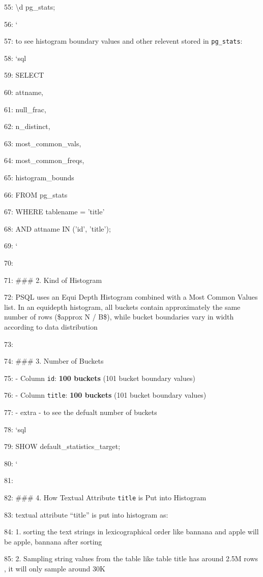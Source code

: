 \documentclass[11pt,a4paper]{article}
\begin{document}
55: \textbackslash{}d pg\_stats;

56: \texttt{}`

57: to see histogram boundary values and other relevent  stored in \texttt{pg\_stats}:

58: \texttt{}`sql

59: SELECT

60:     attname,

61:     null\_frac,

62:     n\_distinct,

63:     most\_common\_vals,

64:     most\_common\_freqs,

65:     histogram\_bounds

66: FROM pg\_stats

67: WHERE tablename = 'title'

68:   AND attname IN ('id', 'title');

69: \texttt{}`

70:

71: \#\#\# 2. Kind of Histogram

72: PSQL uses an Equi Depth Histogram combined with a Most Common Values list. In an equidepth histogram, all buckets contain approximately the same number of rows (\$approx N / B\$), while bucket boundaries vary in width according to data distribution

73:

74: \#\#\# 3. Number of Buckets

75: - Column \texttt{id}: \textbf{100 buckets} (101 bucket boundary values)

76: - Column \texttt{title}: \textbf{100 buckets} (101 bucket boundary values)

77: - extra -  to see the defualt number of buckets

78: \texttt{}`sql

79: SHOW default\_statistics\_target;

80: \texttt{}`

81:

82: \#\#\# 4. How Textual Attribute \texttt{title} is Put into Histogram

83: textual attribute “title” is put into histogram as:

84: 1. sorting the text strings in lexicographical order like bannana and apple will be apple, bannana after sorting

85: 2. Sampling string values from the table like table title has around 2.5M rows , it will only sample around 30K
\end{document}
